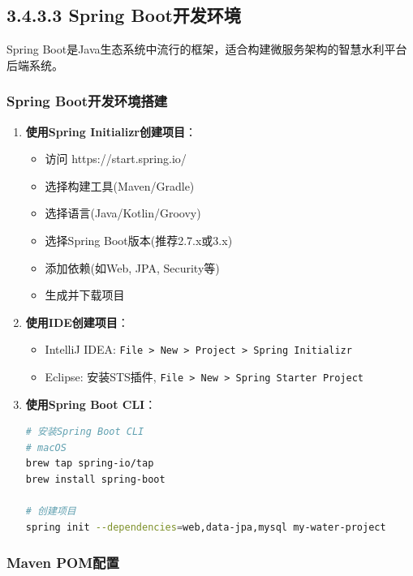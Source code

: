 \subsection{3.4.3.3 Spring
Boot开发环境}\label{spring-bootux5f00ux53d1ux73afux5883}

Spring
Boot是Java生态系统中流行的框架，适合构建微服务架构的智慧水利平台后端系统。

\subsubsection{Spring
Boot开发环境搭建}\label{spring-bootux5f00ux53d1ux73afux5883ux642dux5efa}

\begin{enumerate}
\def\labelenumi{\arabic{enumi}.}
\item
  \textbf{使用Spring Initializr创建项目}：

  \begin{itemize}
  \tightlist
  \item
    访问 https://start.spring.io/
  \item
    选择构建工具(Maven/Gradle)
  \item
    选择语言(Java/Kotlin/Groovy)
  \item
    选择Spring Boot版本(推荐2.7.x或3.x)
  \item
    添加依赖(如Web, JPA, Security等)
  \item
    生成并下载项目
  \end{itemize}
\item
  \textbf{使用IDE创建项目}：

  \begin{itemize}
  \tightlist
  \item
    IntelliJ IDEA:
    \passthrough{\lstinline!File > New > Project > Spring Initializr!}
  \item
    Eclipse: 安装STS插件,
    \passthrough{\lstinline!File > New > Spring Starter Project!}
  \end{itemize}
\item
  \textbf{使用Spring Boot CLI}：

\begin{lstlisting}[language=bash]
# 安装Spring Boot CLI
# macOS
brew tap spring-io/tap
brew install spring-boot

# 创建项目
spring init --dependencies=web,data-jpa,mysql my-water-project
\end{lstlisting}
\end{enumerate}

\subsubsection{Maven POM配置}\label{maven-pomux914dux7f6e}

